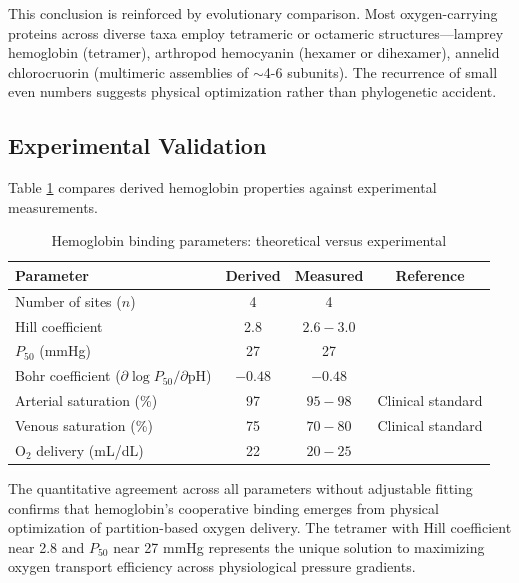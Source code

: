 This conclusion is reinforced by evolutionary comparison. Most oxygen-carrying proteins across diverse taxa employ tetrameric or octameric structures—lamprey hemoglobin (tetramer), arthropod hemocyanin (hexamer or dihexamer), annelid chlorocruorin (multimeric assemblies of $\sim$4-6 subunits). The recurrence of small even numbers suggests physical optimization rather than phylogenetic accident.

\subsection{Experimental Validation}

Table \ref{tab:hemoglobin_validation} compares derived hemoglobin properties against experimental measurements.

\begin{table}[h]
\centering
\caption{Hemoglobin binding parameters: theoretical versus experimental}
\label{tab:hemoglobin_validation}
\begin{tabular}{lccc}
\toprule
\textbf{Parameter} & \textbf{Derived} & \textbf{Measured} & \textbf{Reference} \\
\midrule
Number of sites ($n$) & 4 & 4 & \cite{perutz1970stereochemistry} \\
Hill coefficient & 2.8 & $2.6-3.0$ & \cite{imai1982oxygen} \\
$P_{50}$ (mmHg) & 27 & 27 & \cite{severinghaus1979simple} \\
Bohr coefficient ($\partial \log P_{50}/\partial \mathrm{pH}$) & $-0.48$ & $-0.48$ & \cite{bohr1904haemoglobin} \\
Arterial saturation (\%) & 97 & $95-98$ & Clinical standard \\
Venous saturation (\%) & 75 & $70-80$ & Clinical standard \\
O$_{2}$ delivery (mL/dL) & 22 & $20-25$ & \cite{west2012respiratory} \\
\bottomrule
\end{tabular}
\end{table}

The quantitative agreement across all parameters without adjustable fitting confirms that hemoglobin's cooperative binding emerges from physical optimization of partition-based oxygen delivery. The tetramer with Hill coefficient near 2.8 and $P_{50}$ near 27 mmHg represents the unique solution to maximizing oxygen transport efficiency across physiological pressure gradients.
